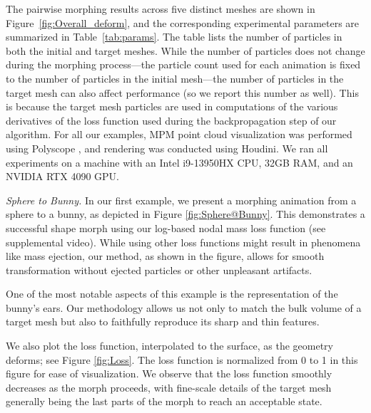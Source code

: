     The pairwise morphing results across five distinct meshes are shown in Figure~\ref{fig:Overall_deform}, and the corresponding experimental parameters are summarized in Table~\ref{tab:params}.
    The table lists the number of particles in both the initial and target meshes.
    While the number of particles does not change during the morphing process---the particle count used for each animation is fixed to the number of particles in the initial mesh---the number of particles in the target mesh can also affect performance (so we report this number as well).
    This is because the target mesh particles are used in computations of the various derivatives of the loss function used during the backpropagation step of our algorithm.
    For all our examples, MPM point cloud visualization was performed using Polyscope \citep{polyscope}, and rendering was conducted using Houdini.
    We ran all experiments on a machine with an Intel i9-13950HX CPU, 32GB RAM, and an NVIDIA RTX 4090 GPU.

    \textit{Sphere to Bunny.} In our first example,  we present a morphing animation from a sphere to a bunny, as depicted in Figure \ref{fig:Sphere@Bunny}. This demonstrates a successful shape morph using our log-based nodal mass loss function (see supplemental video). While using other loss functions might result in phenomena like mass ejection, our method, as shown in the figure, allows for smooth transformation without ejected particles or other unpleasant artifacts.
    
    One of the most notable aspects of this example is the representation of the bunny's ears.
    Our methodology allows us not only to match the bulk volume of a target mesh but also to faithfully reproduce its sharp and thin features.



    We also plot the loss function, interpolated to the surface, as the geometry deforms; see Figure \ref{fig:Loss}.
    The loss function is normalized from 0 to 1 in this figure for ease of visualization.
    We observe that the loss function smoothly decreases as the morph proceeds, with fine-scale details of the target mesh generally being the last parts of the morph to reach an acceptable state. %
    

